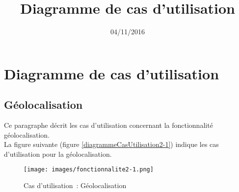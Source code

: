 \documentclass[asi, sansVersion]{picInsa}
\begin{document}
\title{Diagramme de cas d'utilisation}
\author{\Melissa}
\date{04/11/2016} 

\maketitle

\tableofcontents

\chapter{Diagramme de cas d'utilisation}

\section{Géolocalisation}
Ce paragraphe décrit les cas d'utilisation concernant la fonctionnalité géolocalisation. \\

La figure suivante (figure \ref{diagrammeCasUtilisation2-1}) indique les cas d'utilisation pour la géolocalisation.
\begin{figure}[H]
	\centering
	\texttt{[image: images/fonctionnalite2-1.png]}
	\caption{Cas d'utilisation~: Géolocalisation }
	\label{diagrammeCasUtilisation1-1}
\end{figure}
\end{document}
